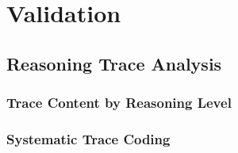 \chapter{Validation} %
\label{Validation}


\section{Reasoning Trace Analysis}

\subsection{Trace Content by Reasoning Level}

\subsection{Systematic Trace Coding}

